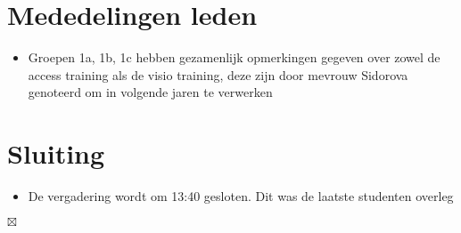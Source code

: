 \documentclass[]{article}
\begin{document}
\section{Mededelingen leden}

  \begin{itemize}
    \item Groepen 1a, 1b, 1c hebben gezamenlijk opmerkingen gegeven over zowel de access training als de visio training, deze zijn door mevrouw Sidorova genoteerd om in volgende jaren te verwerken
  \end{itemize}


\section{Sluiting}

  \begin{itemize}
    \item De vergadering wordt om 13:40 gesloten. Dit was de laatste studenten overleg
  \end{itemize}

$\boxtimes$
\end{document}
